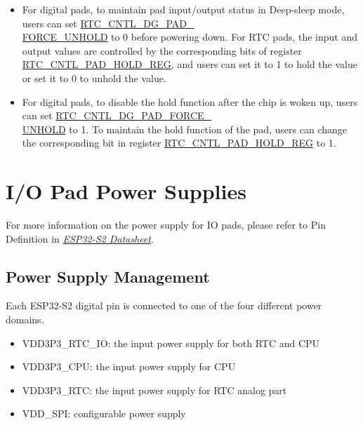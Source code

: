 \documentclass[main\_\_EN.tex]{subfiles}
\begin{document}
\begin{tiplisting}
\vspace{-2em}
\begin{itemize}
\item For digital pads, to maintain pad input/output status in Deep-sleep mode, users can set \hyperref[fielddesc:RTCCNTLDGPADFORCEUNHOLD]{RTC\_CNTL\_DG\_PAD\_\\FORCE\_UNHOLD} to 0 before powering down. For RTC pads, the input and output values are controlled by the corresponding bits of register \hyperref[regdesc:RTCCNTLPADHOLDREG]{RTC\_CNTL\_PAD\_HOLD\_REG}, and users can set it to 1 to hold the value or set it to 0 to unhold the value.
\item For digital pads, to disable the hold function after the chip is woken up, users can set \hyperref[fielddesc:RTCCNTLDGPADFORCEUNHOLD]{RTC\_CNTL\_DG\_PAD\_FORCE\_\\UNHOLD} to 1. To maintain the hold function of the pad, users can change the corresponding bit in register \hyperref[regdesc:RTCCNTLPADHOLDREG]{RTC\_CNTL\_PAD\_HOLD\_REG} to 1.

\end{itemize}
\end{tiplisting}

\vspace{-3em}
\section{I/O Pad Power Supplies}\label{I/O Pad Power Supplies}

For more information on the power supply for IO pads, please refer to Pin Definition in  {\it{\href{https://www.espressif.com/sites/default/files/documentation/esp32-s2_datasheet_en.pdf}{ESP32-S2 Datasheet}}}.

\subsection{Power Supply Management}

Each ESP32-S2 digital pin is connected to one of the four different power domains.
\begin{itemize}
    \item VDD3P3\_RTC\_IO: the input power supply for both RTC and CPU
    \item VDD3P3\_CPU: the input power supply for CPU
    \item VDD3P3\_RTC: the input power supply for RTC analog part
    \item VDD\_SPI: configurable power supply
\end{itemize}
\end{document}

